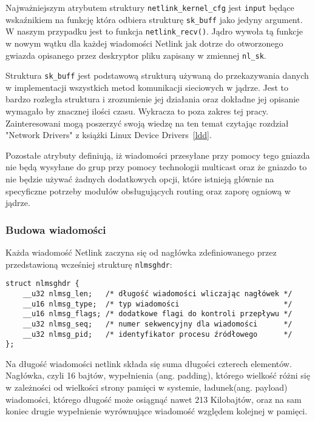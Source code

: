 \documentclass[10pt]{article}
\begin{document}
Najważniejszym atrybutem struktury \texttt{netlink\_kernel\_cfg} jest \texttt{input} będące wskaźnikiem na funkcję która odbiera strukturę \texttt{sk\_buff} jako jedyny argument. W naszym przypadku jest to funkcja \texttt{netlink\_recv()}. Jądro wywoła tą funkcje w nowym wątku dla każdej wiadomości Netlink jak dotrze do otworzonego gwiazda opisanego przez deskryptor pliku zapisany w zmiennej \texttt{nl\_sk}.

Struktura \texttt{sk\_buff} jest podstawową strukturą używaną do przekazywania danych w implementacji wszystkich metod komunikacji sieciowych w jądrze. Jest to bardzo rozległa struktura i zrozumienie jej działania oraz dokładne jej opisanie wymagało by znacznej ilości czasu.  Wykracza to poza zakres tej pracy. Zainteresowani mogą poszerzyć swoją wiedzę na ten temat czytając rozdział "Network Drivers" z książki Linux Device Drivers~\ref{ldd}.

Pozostałe atrybuty definiują, iż wiadomości przesyłane przy pomocy tego gniazda nie będą wysyłane do grup przy pomocy technologii multicast oraz że gniazdo to nie będzie używać żadnych dodatkowych opcji, które istnieją głównie na specyficzne potrzeby modułów obsługujących routing oraz zaporę ogniową w jądrze.

\subsubsection{Budowa wiadomości}
\label{msgbuild}

Każda wiadomość Netlink zaczyna się od nagłówka zdefiniowanego przez przedstawioną wcześniej strukturę \texttt{nlmsghdr}:

\begin{verbatim}
struct nlmsghdr {
    __u32 nlmsg_len;   /* długość wiadomości wliczając nagłówek */
    __u16 nlmsg_type;  /* typ wiadomości                        */
    __u16 nlmsg_flags; /* dodatkowe flagi do kontroli przepływu */
    __u32 nlmsg_seq;   /* numer sekwencyjny dla wiadomości      */
    __u32 nlmsg_pid;   /* identyfikator procesu źródłowego      */
};
\end{verbatim}

Na długość wiadomości netlink składa się suma długości czterech elementów. Nagłówka, czyli 16 bajtów, wypełnienia (ang. padding), którego wielkość różni się w zależności od wielkości strony pamięci w systemie, ładunek(ang. payload) wiadomości, którego długość może osiągnąć nawet 213 Kilobajtów, oraz na sam koniec drugie wypełnienie wyrównujące wiadomość względem kolejnej w pamięci.
\end{document}

